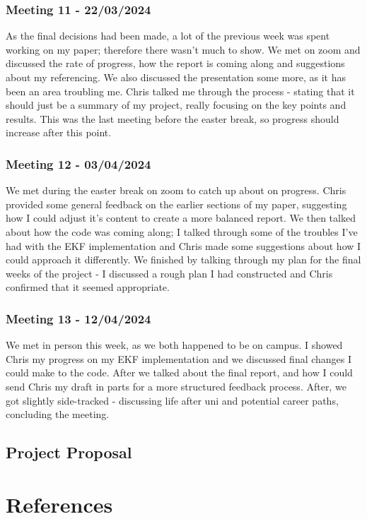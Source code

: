 \documentclass[12pt]{article}
\begin{document}
\subsubsection{Meeting 11 - 22/03/2024}
As the final decisions had been made, a lot of the previous week was spent working on my paper; therefore there wasn't much to show.
We met on zoom and discussed the rate of progress, how the report is coming along and suggestions about my referencing. We also
discussed the presentation some more, as it has been an area troubling me. Chris talked me through the process - stating that it should
just be a summary of my project, really focusing on the key points and results. This was the last meeting before the easter break, so
progress should increase after this point.
\subsubsection{Meeting 12 - 03/04/2024}
We met during the easter break on zoom to catch up about on progress. Chris provided some general feedback on the earlier sections
of my paper, suggesting how I could adjust it's content to create a more balanced report. We then talked about how the code was
coming along; I talked through some of the troubles I've had with the EKF implementation and Chris made some suggestions about
how I could approach it differently. We finished by talking through my plan for the final weeks of the project - I discussed a rough
plan I had constructed and Chris confirmed that it seemed appropriate.
\subsubsection{Meeting 13 - 12/04/2024}
We met in person this week, as we both happened to be on campus. I showed Chris my progress on my EKF implementation and we discussed
final changes I could make to the code. After we talked about the final report, and how I could send Chris my draft in parts for a more
structured feedback process. After, we got slightly side-tracked - discussing life after uni and potential career paths, concluding
the meeting.\\


\subsection{Project Proposal}



\section{References}
\end{document}
